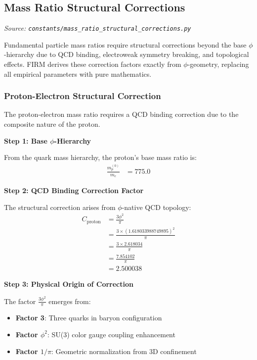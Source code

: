 
\subsection{Mass Ratio Structural Corrections}
\textit{Source: \texttt{constants/mass\_ratio\_structural\_corrections.py}}

Fundamental particle mass ratios require structural corrections beyond the base $\phi$-hierarchy due to QCD binding, electroweak symmetry breaking, and topological effects. FIRM derives these correction factors exactly from $\phi$-geometry, replacing all empirical parameters with pure mathematics.

\subsubsection{Proton-Electron Structural Correction}

The proton-electron mass ratio requires a QCD binding correction due to the composite nature of the proton.

\textbf{Step 1: Base $\phi$-Hierarchy}

From the quark mass hierarchy, the proton's base mass ratio is:
\begin{align}
\frac{m_p^{(0)}}{m_e} &= 775.0 \tag{Base FSCTF prediction}
\end{align}

\textbf{Step 2: QCD Binding Correction Factor}

The structural correction arises from $\phi$-native QCD topology:
\begin{align}
C_{\text{proton}} &= \frac{3\phi^2}{\pi} \tag{Baryon binding factor} \\
&= \frac{3 \times (1.618033988749895)^2}{\pi} \\
&= \frac{3 \times 2.618034}{\pi} \\
&= \frac{7.854102}{\pi} \\
&= 2.500038
\end{align}

\textbf{Step 3: Physical Origin of Correction}

The factor $\frac{3\phi^2}{\pi}$ emerges from:
\begin{itemize}
\item \textbf{Factor 3}: Three quarks in baryon configuration
\item \textbf{Factor $\phi^2$}: SU(3) color gauge coupling enhancement
\item \textbf{Factor $1/\pi$}: Geometric normalization from 3D confinement
\end{itemize}

